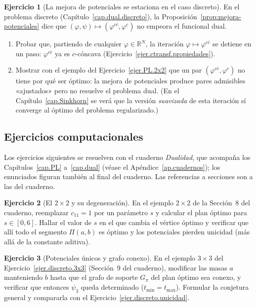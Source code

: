 \documentclass[12pt, a4paper]{amsbook}
\newcommand{\R}{{\mathbb R}}
\theoremstyle{remark}
\theoremstyle{definition}
\newtheorem{ejercicio}{Ejercicio}[chapter]
\numberwithin{section}{chapter}
\numberwithin{subsection}{section}
\numberwithin{equation}{section}
\numberwithin{figure}{chapter}
\begin{document}
\begin{ejercicio}[La mejora de potenciales se estaciona en el caso discreto]\label{ejer.mejora.discreta}
En el problema discreto (Capítulo~\ref{cap.dual.discreto}), la
Proposición~\ref{prop:mejora-potenciales} dice que $(\varphi,\psi)\mapsto
(\varphi^{c\bar c},\varphi^c)$ no empeora el funcional dual.
\begin{enumerate}[label=(\alph*)]
\item Probar que, partiendo de cualquier $\varphi\in\R^N$, la iteración
$\varphi\mapsto\varphi^{c\bar c}$ se detiene en un paso: $\varphi^{c\bar c}$
ya es $c$-cóncava (Ejercicio~\ref{ejer.ctransf.propiedades}).
\item Mostrar con el ejemplo del Ejercicio~\ref{ejer.PL.2x2} que un par
$(\varphi^{c\bar c},\varphi^c)$ no tiene por qué ser óptimo: la mejora de
potenciales produce pares admisibles «ajustados» pero no resuelve el
problema dual. (En el Capítulo~\ref{cap.Sinkhorn} se verá que la versión
\emph{suavizada} de esta iteración sí converge al óptimo del problema
regularizado.)
\end{enumerate}
\end{ejercicio}

\subsection*{Ejercicios computacionales}

Los ejercicios siguientes se resuelven con el cuaderno \emph{Dualidad}, que
acompaña los Capítulos~\ref{cap.PL} a~\ref{cap.dual} (véase el
Apéndice~\ref{ap.cuadernos}); los enunciados figuran también al final del
cuaderno. Las referencias a secciones son a las del cuaderno.

\begin{ejercicio}[El $2\times2$ y su degeneración]\label{ejc.dual.2x2}
En el ejemplo $2\times2$ de la Sección~8 del cuaderno, reemplazar
$c_{11}=1$ por un parámetro $s$ y calcular el plan óptimo para $s\in[0,6]$.
Hallar el valor de $s$ en el que cambia el vértice óptimo y verificar que allí
todo el segmento $\Pi(a,b)$ es óptimo y los potenciales pierden unicidad (más
allá de la constante aditiva).
\end{ejercicio}

\begin{ejercicio}[Potenciales únicos y grafo conexo]\label{ejc.dual.conexo}
En el ejemplo $3\times3$ del Ejercicio~\ref{ejer.discreto.3x3} (Sección~9
del cuaderno), modificar las masas $a$ manteniendo $b$ hasta que el grafo de
soporte $G_\pi$ del plan óptimo sea conexo, y verificar que entonces $\psi_3$
queda determinado ($t_{\min}=t_{\max}$). Formular la conjetura general y
compararla con el Ejercicio~\ref{ejer.discreto.unicidad}.
\end{ejercicio}
\end{document}
